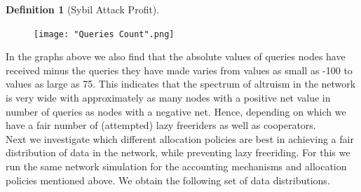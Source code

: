 \documentclass[11pt,a4paper]{report}
\theoremstyle{definition}
\newtheorem{definition}{Definition}[section]
\theoremstyle{theorem}
\theoremstyle{proposition}
\theoremstyle{corollary}
\theoremstyle{lemma}
\theoremstyle{example}
\theoremstyle{remark}
\begin{document}
\begin{definition}[Sybil Attack Profit]
\begin{figure}[H]
\begin{center}
\texttt{[image: "Queries Count".png]}
\end{center}
\end{figure}

\noindent{}In the graphs above we also find that the absolute values of queries nodes have received minus the queries they have made varies from values as small as -100 to values as large as 75. This indicates that the spectrum of altruism in the network is very wide with approximately as many nodes with a positive net value in number of queries as nodes with a negative net. Hence, depending on which we have a fair number of (attempted) lazy freeriders as well as cooperators. \vspace{1em}\\

\noindent{}Next we investigate which different allocation policies are best in achieving a fair distribution of data in the network, while preventing lazy freeriding. For this we run the same network simulation for the accounting mechanisms and allocation policies mentioned above. We obtain the following set of data distributions.


\end{definition}
\end{document}
